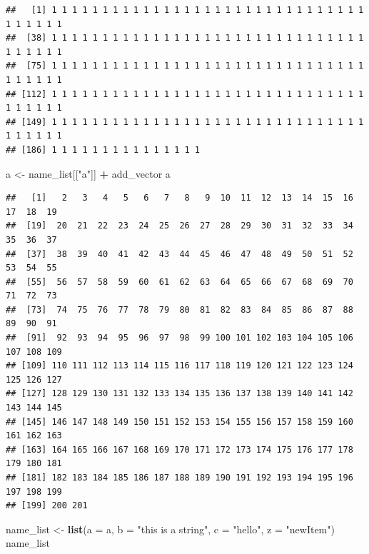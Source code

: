 \documentclass[]{article}
\newenvironment{Shaded}{\begin{snugshade}}{\end{snugshade}}
\newcommand{\DataTypeTok}[1]{\textcolor[rgb]{0.13,0.29,0.53}{#1}}
\newcommand{\KeywordTok}[1]{\textcolor[rgb]{0.13,0.29,0.53}{\textbf{#1}}}
\newcommand{\NormalTok}[1]{#1}
\newcommand{\OperatorTok}[1]{\textcolor[rgb]{0.81,0.36,0.00}{\textbf{#1}}}
\newcommand{\StringTok}[1]{\textcolor[rgb]{0.31,0.60,0.02}{#1}}
\begin{document}
\begin{verbatim}
##   [1] 1 1 1 1 1 1 1 1 1 1 1 1 1 1 1 1 1 1 1 1 1 1 1 1 1 1 1 1 1 1 1 1 1 1 1 1 1
##  [38] 1 1 1 1 1 1 1 1 1 1 1 1 1 1 1 1 1 1 1 1 1 1 1 1 1 1 1 1 1 1 1 1 1 1 1 1 1
##  [75] 1 1 1 1 1 1 1 1 1 1 1 1 1 1 1 1 1 1 1 1 1 1 1 1 1 1 1 1 1 1 1 1 1 1 1 1 1
## [112] 1 1 1 1 1 1 1 1 1 1 1 1 1 1 1 1 1 1 1 1 1 1 1 1 1 1 1 1 1 1 1 1 1 1 1 1 1
## [149] 1 1 1 1 1 1 1 1 1 1 1 1 1 1 1 1 1 1 1 1 1 1 1 1 1 1 1 1 1 1 1 1 1 1 1 1 1
## [186] 1 1 1 1 1 1 1 1 1 1 1 1 1 1 1
\end{verbatim}

\begin{Shaded}
\begin{Highlighting}[]
\NormalTok{a <-}\StringTok{ }\NormalTok{name_list[[}\StringTok{"a"}\NormalTok{]] }\OperatorTok{+}\StringTok{ }\NormalTok{add_vector}
\NormalTok{a}
\end{Highlighting}
\end{Shaded}

\begin{verbatim}
##   [1]   2   3   4   5   6   7   8   9  10  11  12  13  14  15  16  17  18  19
##  [19]  20  21  22  23  24  25  26  27  28  29  30  31  32  33  34  35  36  37
##  [37]  38  39  40  41  42  43  44  45  46  47  48  49  50  51  52  53  54  55
##  [55]  56  57  58  59  60  61  62  63  64  65  66  67  68  69  70  71  72  73
##  [73]  74  75  76  77  78  79  80  81  82  83  84  85  86  87  88  89  90  91
##  [91]  92  93  94  95  96  97  98  99 100 101 102 103 104 105 106 107 108 109
## [109] 110 111 112 113 114 115 116 117 118 119 120 121 122 123 124 125 126 127
## [127] 128 129 130 131 132 133 134 135 136 137 138 139 140 141 142 143 144 145
## [145] 146 147 148 149 150 151 152 153 154 155 156 157 158 159 160 161 162 163
## [163] 164 165 166 167 168 169 170 171 172 173 174 175 176 177 178 179 180 181
## [181] 182 183 184 185 186 187 188 189 190 191 192 193 194 195 196 197 198 199
## [199] 200 201
\end{verbatim}

\begin{Shaded}
\begin{Highlighting}[]
\NormalTok{name_list <-}\StringTok{ }\KeywordTok{list}\NormalTok{(}\DataTypeTok{a =}\NormalTok{ a, }\DataTypeTok{b =} \StringTok{"this is a string"}\NormalTok{, }
                  \DataTypeTok{c =} \StringTok{"hello"}\NormalTok{, }\DataTypeTok{z =} \StringTok{"newItem"}\NormalTok{)}
\NormalTok{name_list}
\end{Highlighting}
\end{Shaded}
\end{document}
